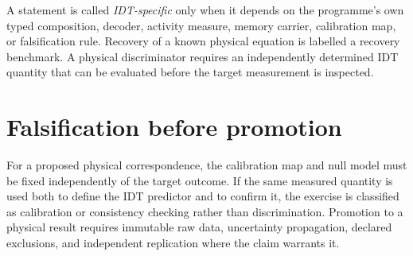 A statement is called \emph{IDT-specific} only when it depends on the programme's own typed composition, decoder, activity measure, memory carrier, calibration map, or falsification rule. Recovery of a known physical equation is labelled a recovery benchmark. A physical discriminator requires an independently determined IDT quantity that can be evaluated before the target measurement is inspected.

\section*{Falsification before promotion}

For a proposed physical correspondence, the calibration map and null model must be fixed independently of the target outcome. If the same measured quantity is used both to define the IDT predictor and to confirm it, the exercise is classified as calibration or consistency checking rather than discrimination. Promotion to a physical result requires immutable raw data, uncertainty propagation, declared exclusions, and independent replication where the claim warrants it.
